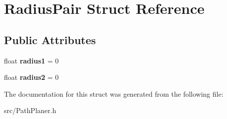 \hypertarget{struct_radius_pair}{}\section{Radius\+Pair Struct Reference}
\label{struct_radius_pair}
\subsection*{Public Attributes}
\begin{DoxyCompactItemize}
\item 
float {\bfseries radius1} = 0\hypertarget{struct_radius_pair_aa8009385211e624eab6e935271b67e03}{}\label{struct_radius_pair_aa8009385211e624eab6e935271b67e03}

\item 
float {\bfseries radius2} = 0\hypertarget{struct_radius_pair_a6e1815a81be295264a90b320094a9a97}{}\label{struct_radius_pair_a6e1815a81be295264a90b320094a9a97}

\end{DoxyCompactItemize}


The documentation for this struct was generated from the following file\+:\begin{DoxyCompactItemize}
\item 
src/Path\+Planer.\+h\end{DoxyCompactItemize}

